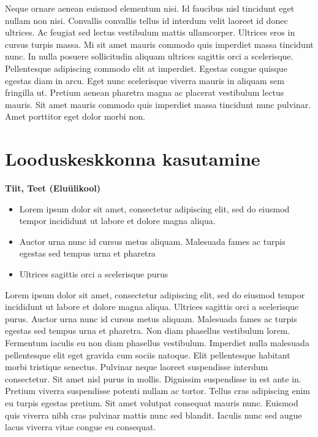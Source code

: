 \documentclass[]{book}
\begin{document}
Neque ornare aenean euismod elementum nisi. Id faucibus nisl tincidunt eget nullam non nisi. Convallis convallis tellus id interdum velit laoreet id donec ultrices. Ac feugiat sed lectus vestibulum mattis ullamcorper. Ultrices eros in cursus turpis massa. Mi sit amet mauris commodo quis imperdiet massa tincidunt nunc. In nulla posuere sollicitudin aliquam ultrices sagittis orci a scelerisque. Pellentesque adipiscing commodo elit at imperdiet. Egestas congue quisque egestas diam in arcu. Eget nunc scelerisque viverra mauris in aliquam sem fringilla ut. Pretium aenean pharetra magna ac placerat vestibulum lectus mauris. Sit amet mauris commodo quis imperdiet massa tincidunt nunc pulvinar. Amet porttitor eget dolor morbi non.

\hypertarget{chapter31}{%
\section{Looduskeskkonna kasutamine}\label{chapter31}}

\begin{authors}
\textbf{Tiit, Teet (Eluülikool)}
\end{authors}

\begin{points}
\begin{itemize}
\item
  Lorem ipsum dolor sit amet, consectetur adipiscing elit, sed do
  eiusmod tempor incididunt ut labore et dolore magna aliqua.
\item
  Auctor urna nunc id cursus metus aliquam. Malesuada fames ac turpis
  egestas sed tempus urna et pharetra
\item
  Ultrices sagittis orci a scelerisque purus
\end{itemize}
\end{points}

Lorem ipsum dolor sit amet, consectetur adipiscing elit, sed do eiusmod tempor incididunt ut labore et dolore magna aliqua. Ultrices sagittis orci a scelerisque purus. Auctor urna nunc id cursus metus aliquam. Malesuada fames ac turpis egestas sed tempus urna et pharetra. Non diam phasellus vestibulum lorem. Fermentum iaculis eu non diam phasellus vestibulum. Imperdiet nulla malesuada pellentesque elit eget gravida cum sociis natoque. Elit pellentesque habitant morbi tristique senectus. Pulvinar neque laoreet suspendisse interdum consectetur. Sit amet nisl purus in mollis. Dignissim suspendisse in est ante in. Pretium viverra suspendisse potenti nullam ac tortor. Tellus cras adipiscing enim eu turpis egestas pretium. Sit amet volutpat consequat mauris nunc. Euismod quis viverra nibh cras pulvinar mattis nunc sed blandit. Iaculis nunc sed augue lacus viverra vitae congue eu consequat.
\end{document}
